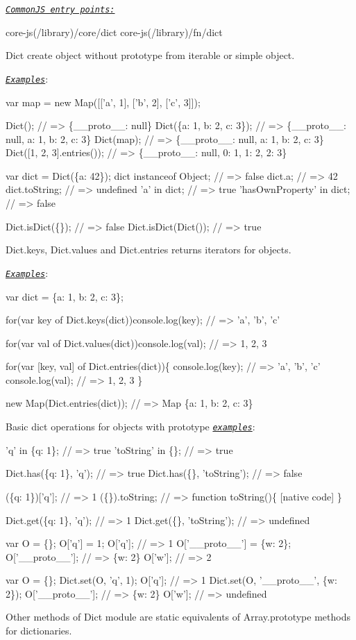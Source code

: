 \href{#commonjs}{\tt {\itshape Common\+JS entry points\+:}} 
\begin{DoxyCode}
core-js(/library)/core/dict
core-js(/library)/fn/dict
\end{DoxyCode}
 {\ttfamily Dict} create object without prototype from iterable or simple object.

\href{http://goo.gl/pnp8Vr}{\tt {\itshape Examples}}\+: 
\begin{DoxyCode}
var map = new Map([['a', 1], ['b', 2], ['c', 3]]);

Dict();                    // => \{\_\_proto\_\_: null\}
Dict(\{a: 1, b: 2, c: 3\});  // => \{\_\_proto\_\_: null, a: 1, b: 2, c: 3\}
Dict(map);                 // => \{\_\_proto\_\_: null, a: 1, b: 2, c: 3\}
Dict([1, 2, 3].entries()); // => \{\_\_proto\_\_: null, 0: 1, 1: 2, 2: 3\}

var dict = Dict(\{a: 42\});
dict instanceof Object;   // => false
dict.a;                   // => 42
dict.toString;            // => undefined
'a' in dict;              // => true
'hasOwnProperty' in dict; // => false

Dict.isDict(\{\});     // => false
Dict.isDict(Dict()); // => true
\end{DoxyCode}
 {\ttfamily Dict.\+keys}, {\ttfamily Dict.\+values} and {\ttfamily Dict.\+entries} returns iterators for objects.

\href{http://goo.gl/xAvECH}{\tt {\itshape Examples}}\+: 
\begin{DoxyCode}
var dict = \{a: 1, b: 2, c: 3\};

for(var key of Dict.keys(dict))console.log(key); // => 'a', 'b', 'c'

for(var val of Dict.values(dict))console.log(val); // => 1, 2, 3

for(var [key, val] of Dict.entries(dict))\{
  console.log(key); // => 'a', 'b', 'c'
  console.log(val); // => 1, 2, 3
\}

new Map(Dict.entries(dict)); // => Map \{a: 1, b: 2, c: 3\}
\end{DoxyCode}
 Basic dict operations for objects with prototype \href{http://goo.gl/B28UnG}{\tt {\itshape examples}}\+: 
\begin{DoxyCode}
'q' in \{q: 1\};            // => true
'toString' in \{\};         // => true

Dict.has(\{q: 1\}, 'q');    // => true
Dict.has(\{\}, 'toString'); // => false

(\{q: 1\})['q'];            // => 1
(\{\}).toString;            // => function toString()\{ [native code] \}

Dict.get(\{q: 1\}, 'q');    // => 1
Dict.get(\{\}, 'toString'); // => undefined

var O = \{\};
O['q'] = 1;
O['q'];         // => 1
O['\_\_proto\_\_'] = \{w: 2\};
O['\_\_proto\_\_']; // => \{w: 2\}
O['w'];         // => 2

var O = \{\};
Dict.set(O, 'q', 1);
O['q'];         // => 1
Dict.set(O, '\_\_proto\_\_', \{w: 2\});
O['\_\_proto\_\_']; // => \{w: 2\}
O['w'];         // => undefined
\end{DoxyCode}
 Other methods of {\ttfamily Dict} module are static equivalents of {\ttfamily Array.\+prototype} methods for dictionaries.

